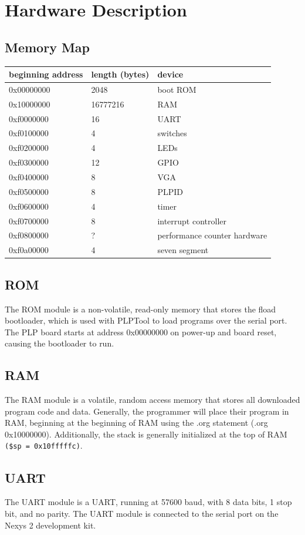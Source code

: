 \documentclass{article}
\begin{document}
\section{Hardware Description}
\subsection{Memory Map}
\begin{tabular}{| l | l | l |}
\hline
\textbf{beginning address} & \textbf{length (bytes)} & device \\
\hline
0x00000000 & 2048 & boot ROM \\
0x10000000 & 16777216 & RAM \\
0xf0000000 & 16 & UART \\
0xf0100000 & 4 & switches \\
0xf0200000 & 4 & LEDs \\
0xf0300000 & 12 & GPIO \\
0xf0400000 & 8 & VGA \\
0xf0500000 & 8 & PLPID \\
0xf0600000 & 4 & timer \\
0xf0700000 & 8 & interrupt controller \\
0xf0800000 & ? & performance counter hardware \\
0xf0a00000 & 4 & seven segment \\
\hline
\end{tabular}

\subsection{ROM}
The ROM module is a non-volatile, read-only memory that stores the fload bootloader, which is used with PLPTool to load programs over the serial port. The PLP board starts at address 0x00000000 on power-up and board reset, causing the bootloader to run. 
\subsection{RAM}
The RAM module is a volatile, random access memory that stores all downloaded program code and data. Generally, the programmer will place their program in RAM, beginning at the beginning of RAM using the .org statement (.org 0x10000000). Additionally, the stack is generally initialized at the top of RAM \verb+($sp = 0x10fffffc)+.
\subsection{UART}
The UART module is a UART, running at 57600 baud, with 8 data bits, 1 stop bit, and no parity. The UART module is connected to the serial port on the Nexys 2 development kit.
\end{document}
